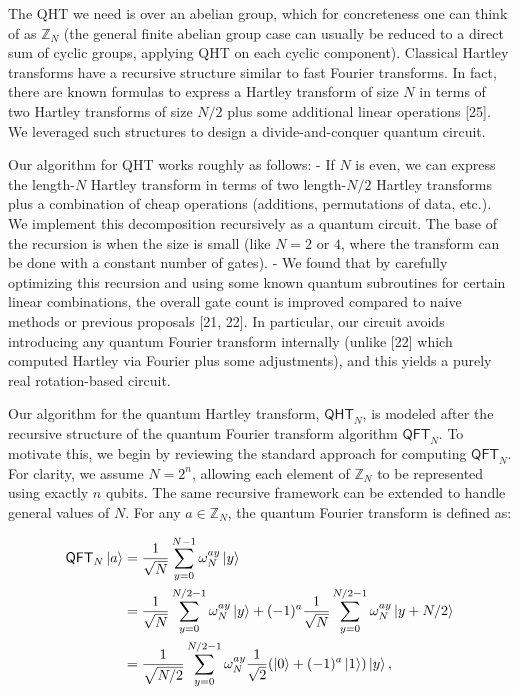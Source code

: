 \documentclass[12pt]{report}
\newcommand{\qht}{\mathsf{QHT}}
\newcommand{\qft}{\mathsf{QFT}}
\begin{document}
The QHT we need is over an abelian group, which for concreteness one can think of as $\mathbb{Z}_N$ (the general finite abelian group case can usually be reduced to a direct sum of cyclic groups, applying QHT on each cyclic component). Classical Hartley transforms have a recursive structure similar to fast Fourier transforms. In fact, there are known formulas to express a Hartley transform of size $N$ in terms of two Hartley transforms of size $N/2$ plus some additional linear operations [25]. We leveraged such structures to design a divide-and-conquer quantum circuit.

Our algorithm for QHT works roughly as follows:
- If $N$ is even, we can express the length-$N$ Hartley transform in terms of two length-$N/2$ Hartley transforms plus a combination of cheap operations (additions, permutations of data, etc.). We implement this decomposition recursively as a quantum circuit. The base of the recursion is when the size is small (like $N=2$ or $4$, where the transform can be done with a constant number of gates).
- We found that by carefully optimizing this recursion and using some known quantum subroutines for certain linear combinations, the overall gate count is improved compared to naive methods or previous proposals [21, 22]. In particular, our circuit avoids introducing any quantum Fourier transform internally (unlike [22] which computed Hartley via Fourier plus some adjustments), and this yields a purely real rotation-based circuit.



Our algorithm for the quantum Hartley transform, \( \qht_N \), is modeled after the recursive structure of the quantum Fourier transform algorithm \( \qft_N \). To motivate this, we begin by reviewing the standard approach for computing \( \qft_N \). For clarity, we assume \( N = 2^n \), allowing each element of \( \mathbb{Z}_N \) to be represented using exactly \( n \) qubits. The same recursive framework can be extended to handle general values of \( N \). For any \( a \in \mathbb{Z}_N \), the quantum Fourier transform is defined as:


\begin{align*}
    \qft_N\ket{a}
    & = \frac{1}{\sqrt{N}} \sum_{y = 0}^{N - 1} \omega_N^{ay}\ket{y} \\
    & = \frac{1}{\sqrt{N}} \sum_{y = 0}^{N / 2 - 1} \omega_N^{ay} \ket{y} + (-1)^a \frac{1}{\sqrt{N}} \sum_{y = 0}^{N / 2 - 1} \omega_N^{ay} \ket{y + N/2} \\
    & = \frac{1}{\sqrt{N / 2}} \sum_{y = 0}^{N / 2 - 1} \omega_N^{ay} \frac{1}{\sqrt{2}} (\ket{0} + (-1)^a \ket{1}) \ket{y}, %
\end{align*}
\end{document}
